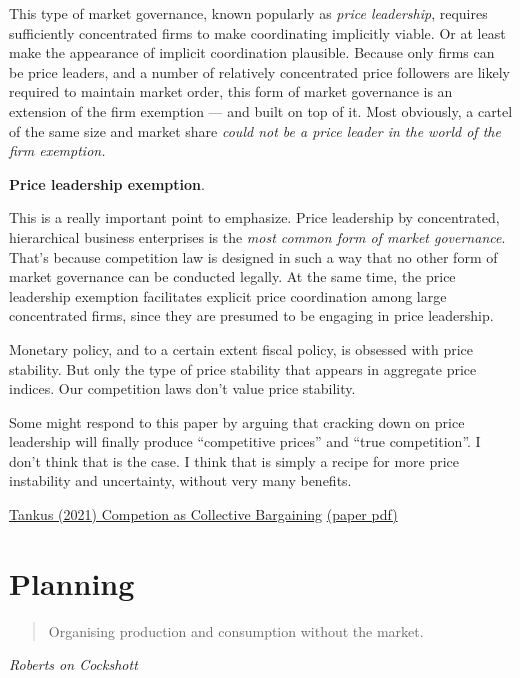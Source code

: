 \documentclass[
]{book}
\begin{document}
This type of market governance, known popularly as \emph{price leadership}, requires sufficiently concentrated firms to make coordinating implicitly viable. Or at least make the appearance of implicit coordination plausible. Because only firms can be price leaders, and a number of relatively concentrated price followers are likely required to maintain market order, this form of market governance is an extension of the firm exemption --- and built on top of it. Most obviously, a cartel of the same size and market share \emph{could not be a price leader in the world of the firm exemption.}

\textbf{Price leadership exemption}.

This is a really important point to emphasize. Price leadership by concentrated, hierarchical business enterprises is the \emph{most common form of market governance}. That's because competition law is designed in such a way that no other form of market governance can be conducted legally. At the same time, the price leadership exemption facilitates explicit price coordination among large concentrated firms, since they are presumed to be engaging in price leadership.

Monetary policy, and to a certain extent fiscal policy, is obsessed with price stability. But only the type of price stability that appears in aggregate price indices. Our competition laws don't value price stability.

Some might respond to this paper by arguing that cracking down on price leadership will finally produce ``competitive prices'' and ``true competition''. I don't think that is the case. I think that is simply a recipe for more price instability and uncertainty, without very many benefits.

\href{https://www.crisesnotes.com/competition-law-as-collective-bargaining-law-published-paper-preview/}{Tankus (2021) Competion as Collective Bargaining}
\href{pdf/Tankus_2021_Competion_Bargaining.pdf}{(paper pdf)}

\hypertarget{planning}{%
\chapter{Planning}\label{planning}}

\begin{quote}
Organising production and consumption without the market.
\end{quote}

\emph{Roberts on Cockshott}
\end{document}
